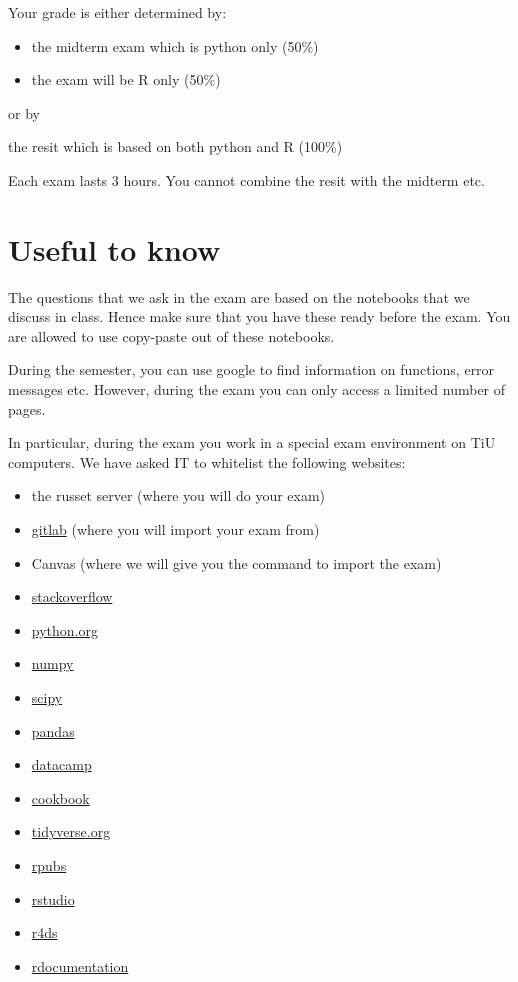 \documentclass[]{book}
\providecommand{\tightlist}{%
  \setlength{\itemsep}{0pt}\setlength{\parskip}{0pt}}
\begin{document}
Your grade is either determined by:

\begin{itemize}
\tightlist
\item
  the midterm exam which is python only (50\%)
\item
  the exam will be R only (50\%)
\end{itemize}

or by

the resit which is based on both python and R (100\%)

Each exam lasts 3 hours. You cannot combine the resit with the midterm
etc.

\section{Useful to know}\label{useful-to-know}

The questions that we ask in the exam are based on the notebooks that we
discuss in class. Hence make sure that you have these ready before the
exam. You are allowed to use copy-paste out of these notebooks.

During the semester, you can use google to find information on
functions, error messages etc. However, during the exam you can only
access a limited number of pages.

In particular, during the exam you work in a special exam environment on
TiU computers. We have asked IT to whitelist the following websites:

\begin{itemize}
\tightlist
\item
  the russet server (where you will do your exam)
\item
  \href{gitlab.uvt.nl}{gitlab} (where you will import your exam from)
\item
  Canvas (where we will give you the command to import the exam)
\item
  \href{https://stackoverflow.com/}{stackoverflow}
\item
  \href{https://www.python.org/}{python.org}
\item
  \href{http://www.numpy.org/}{numpy}
\item
  \href{https://www.scipy.org/}{scipy}
\item
  \href{https://pandas.pydata.org/}{pandas}
\item
  \href{https://www.datacamp.com/home}{datacamp}
\item
  \href{http://www.cookbook-r.com/}{cookbook}
\item
  \href{https://dplyr.tidyverse.org/}{tidyverse.org}
\item
  \href{https://rpubs.com/}{rpubs}
\item
  \href{https://www.rstudio.com/}{rstudio}
\item
  \href{https://r4ds.had.co.nz/}{r4ds}
\item
  \href{https://www.rdocumentation.org/}{rdocumentation}
\end{itemize}
\end{document}
